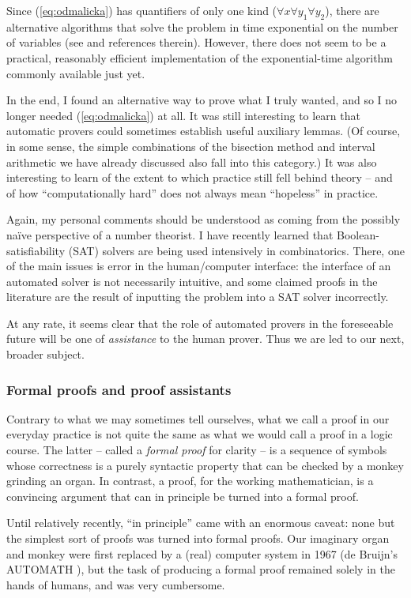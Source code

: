 Since (\ref{eq:odmalicka}) has quantifiers of only one kind
($\forall x \forall y_1 \forall y_2$), there are alternative algorithms
that solve the problem in time exponential on the number of variables
(see \cite[Ch. 11]{opac-b1124307} and references therein).
However, there does not seem to be a practical, reasonably efficient
implementation of the exponential-time algorithm commonly available just yet.

In the end, I found an alternative way to prove what I truly wanted, and so
I no longer needed (\ref{eq:odmalicka}) at all. It was still interesting to
learn that automatic provers could sometimes establish useful auxiliary lemmas. (Of course, in some sense,
the simple combinations of the bisection method and interval arithmetic
we have already discussed also fall into this category.) It was also
interesting to learn of the extent to which
practice still fell behind theory -- and
of how ``computationally hard'' does not always mean ``hopeless'' in practice.

Again, my personal comments should be understood as coming from the possibly
na\"ive perspective of a number theorist. I have recently learned that
Boolean-satisfiability (SAT) solvers are being used intensively in
combinatorics. There, one of the main issues is error in the human/computer
interface: the interface of an automated solver is not necessarily
intuitive, and some claimed proofs in the literature are the result of
inputting the problem into a SAT solver incorrectly.

At any rate, it seems clear that the role of automated provers in the
foreseeable future will be one of {\em assistance} to the human prover.
Thus we are led to our next, broader subject.

\subsubsection{Formal proofs and proof assistants}

Contrary to what we may sometimes tell ourselves,
what we call a proof in our everyday practice is not quite the same as what
we would call a proof in a logic course. The latter -- called a
{\em formal proof} for clarity -- is a sequence of symbols whose
correctness is a purely
syntactic property that can be checked by a monkey grinding
an organ. In contrast, a proof, for the working mathematician, is a convincing
argument that can in principle be turned into a formal proof.

Until relatively
recently, ``in principle'' came with an enormous caveat: none but the
simplest sort of proofs was turned into formal proofs. Our imaginary
organ and monkey were first replaced by a (real) computer system in 1967
(de Bruijn's AUTOMATH \cite{de1970mathematical}),
but the task of producing a formal proof remained solely
in the hands of humans, and was very cumbersome.

